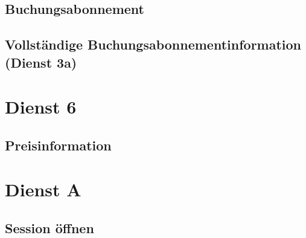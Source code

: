 \subsection*{Buchungsabonnement}
\label{subsec:Nachrichten:Dienst5:BookingAlertSubscription}







\subsection*{Vollständige Buchungsabonnementinformation (Dienst 3a)}
\label{subsec:Nachrichten:Dienst5:CompleteBookingAlert}





\section{Dienst 6}
\label{subsec:Nachrichten:Dienst6}

\subsection*{Preisinformation}
\label{subsec:Nachrichten:Dienst6:PriceInformation}





\section{Dienst A}
\label{subsec:Nachrichten:DienstA}

\subsection*{Session öffnen}
\label{subsec:Nachrichten:DienstA:OpenSession}






